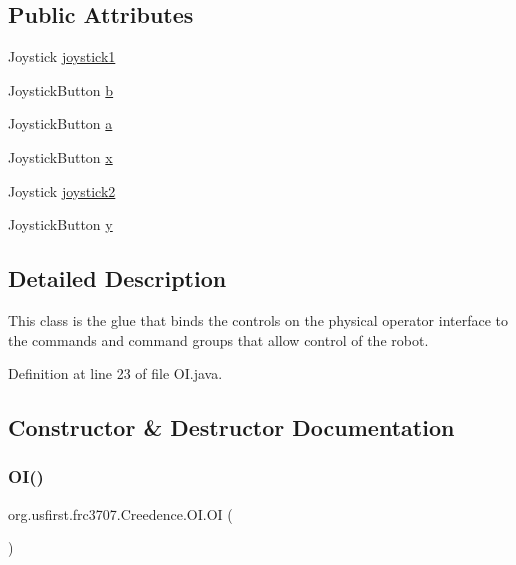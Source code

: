 \subsection*{Public Attributes}
\begin{DoxyCompactItemize}
\item 
Joystick \mbox{\hyperlink{classorg_1_1usfirst_1_1frc3707_1_1_creedence_1_1_o_i_a149cae3e097af15720c4184bdb083bbe}{joystick1}}
\item 
Joystick\+Button \mbox{\hyperlink{classorg_1_1usfirst_1_1frc3707_1_1_creedence_1_1_o_i_a2ffb86884ecb67a05bc524297af392db}{b}}
\item 
Joystick\+Button \mbox{\hyperlink{classorg_1_1usfirst_1_1frc3707_1_1_creedence_1_1_o_i_ac3a8552cf1f408b3fea0306317a3f5f5}{a}}
\item 
Joystick\+Button \mbox{\hyperlink{classorg_1_1usfirst_1_1frc3707_1_1_creedence_1_1_o_i_a5f154c5a9d35253767a1f31be8988640}{x}}
\item 
Joystick \mbox{\hyperlink{classorg_1_1usfirst_1_1frc3707_1_1_creedence_1_1_o_i_aa42d3edba7e332569894f86a9ad90812}{joystick2}}
\item 
Joystick\+Button \mbox{\hyperlink{classorg_1_1usfirst_1_1frc3707_1_1_creedence_1_1_o_i_a2ecf04b607973b5eb138464fafd001d7}{y}}
\end{DoxyCompactItemize}


\subsection{Detailed Description}
This class is the glue that binds the controls on the physical operator interface to the commands and command groups that allow control of the robot. 

Definition at line 23 of file O\+I.\+java.



\subsection{Constructor \& Destructor Documentation}
\mbox{\label{classorg_1_1usfirst_1_1frc3707_1_1_creedence_1_1_o_i_a2835556e3b8a249fc0b451e0a7bcef9b}} 
\subsubsection{\texorpdfstring{OI()}{OI()}}
{\footnotesize\ttfamily org.\+usfirst.\+frc3707.\+Creedence.\+O\+I.\+OI (\begin{DoxyParamCaption}{ }\end{DoxyParamCaption})}



